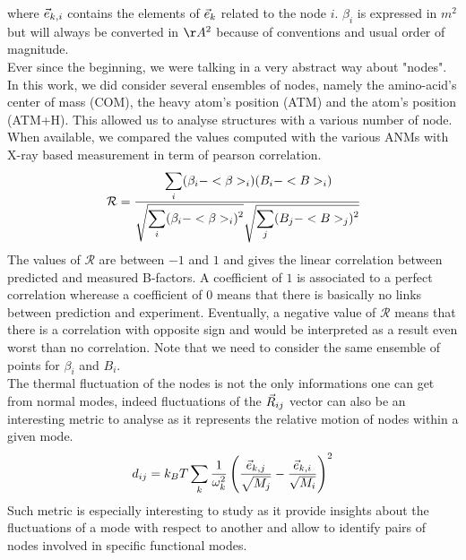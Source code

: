 where $\vec{e}_{k, i}$ contains the elements of $\vec{e}_k$ related to the node $i$. $\beta_i$ is expressed in $m^2$ but will always be converted in $\AA^2$ because of conventions and usual order of magnitude.\\
\noindent Ever since the beginning, we were talking in a very abstract way about "nodes". In this work, we did consider several ensembles of nodes, namely the amino-acid's center of mass (COM), the heavy atom's position (ATM) and the atom's position (ATM+H). This allowed us to analyse structures with a various number of node. When available, we compared the values computed with the various ANMs with X-ray based measurement in term of pearson correlation.
\begin{equation}
	\label{pearsonr}
	\mathcal{R} = \cfrac{\displaystyle\sum_i (\beta_i - <\beta>_i)(B_i - <B>_i)}{\sqrt{\displaystyle\sum_i(\beta_i - <\beta>_i)^2}\sqrt{\displaystyle\sum_j(B_j - <B>_j)^2}}
\end{equation}
The values of $\mathcal{R}$ are between $-1$ and $1$ and gives the linear correlation between predicted and measured B-factors. A coefficient of $1$ is associated to a perfect correlation wherease a coefficient of $0$ means that there is basically no links between prediction and experiment. Eventually, a negative value of $\mathcal{R}$ means that there is a correlation with opposite sign and would be interpreted as a result even worst than no correlation. Note that we need to consider the same ensemble of points for $\beta_i$ and $B_i$.\\
\noindent The thermal fluctuation of the nodes is not the only informations one can get from normal modes, indeed fluctuations of the $\vec{R}_{ij}$ vector can also be an interesting metric to analyse as it represents the relative motion of nodes within a given mode. 
\begin{equation}
	\label{metric dij}
	d_{ij} = k_BT\sum_k \frac{1}{\omega_k^2}\left( \frac{\vec{e}_{k, j}}{\sqrt{M_j}} - \frac{\vec{e}_{k, i}}{\sqrt{M_i}} \right)^2
\end{equation}
Such metric is especially interesting to study as it provide insights about the fluctuations of a mode with respect to another and allow to identify pairs of nodes involved in specific functional modes.
